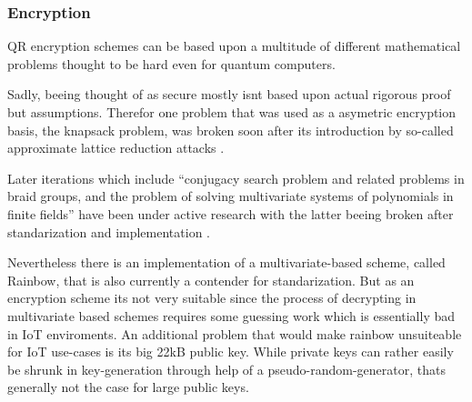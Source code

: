 \documentclass[conference]{IEEEtran}
\newcommand{\comment}[1]{}
\begin{document}
\subsubsection{Encryption}
\comment{ %
    knapsack problem - broken
    ''
    conjugacy search problem and related problems in braid groups, and the problem of solving
    multivariate systems of polynomials in finite fields
    '' also mostly broken or badly understood \cite{QR_algs}

    lattice based:
    - NTRUEncrypt (compare sigs)
    code based:
    - McEliece Error correction codes transformed - secure and fast (100micros) but keys are k*n matrices : millions of bits \cite{QR_algs} - not feasable 
    multivariate-based: decryption inefficent (''guess work'') \cite{QR_comparison}
    - Rainbow gigantic 22kbyte pubk
    Supersingular EC:
    not much in use and not super researched , one impl (SIKE) \cite{QR_comparison}
    Mixed schemes for backwards comp: neither fully safe nor efficent since 2 schemes need to be saved on device \cite{QR_comparison}

mostly code/lattice based implementations \cite{QR_comparison}
} %
QR encryption schemes can be based upon a multitude of different mathematical problems thought to be hard even for quantum computers.

Sadly, beeing thought of as secure mostly isnt based upon actual rigorous proof but assumptions.
Therefor one problem that was used as a asymetric encryption basis, the knapsack problem, was broken soon after its introduction by so-called approximate lattice reduction attacks \cite{QR_algs}.

Later iterations which include ``conjugacy search problem and related problems in braid groups, and the problem of solving
multivariate systems of polynomials in finite fields''\cite{QR_algs} have been under active research with the latter beeing broken after standarization and implementation \cite{QR_algs}.

Nevertheless there is an implementation of a multivariate-based scheme, called Rainbow, that is also currently a contender for standarization. But as an encryption scheme its not very suitable since the process of decrypting in multivariate based schemes requires some guessing work \cite{QR_comparison} which is essentially bad in IoT enviroments.
An additional problem that would make rainbow unsuiteable for IoT use-cases is its big 22kB public key. While private keys can rather easily be shrunk in key-generation through help of a pseudo-random-generator, thats generally not the case for large public keys.
\end{document}
